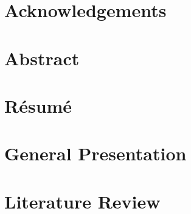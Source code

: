 \documentclass[12pt, a4paper]{report}
\begin{document}
\setmainlanguage{english}



\setmainlanguage{khmer}


\setmainlanguage{french}


\setmainlanguage{english}



\setmainlanguage{english}
\chapter*{Acknowledgements}

\newpage


\setmainlanguage{english}
\chapter*{Abstract}


\setmainlanguage{french}
\chapter*{Résumé}


\setmainlanguage{french}

\tableofcontents
\newpage

\listoffigures
\newpage

\listoftables
\newpage



\setmainlanguage{english}
\clearpage
{}
\pagestyle{fancy}

\chapter{General Presentation}


\chapter{Literature Review}

\end{document}
